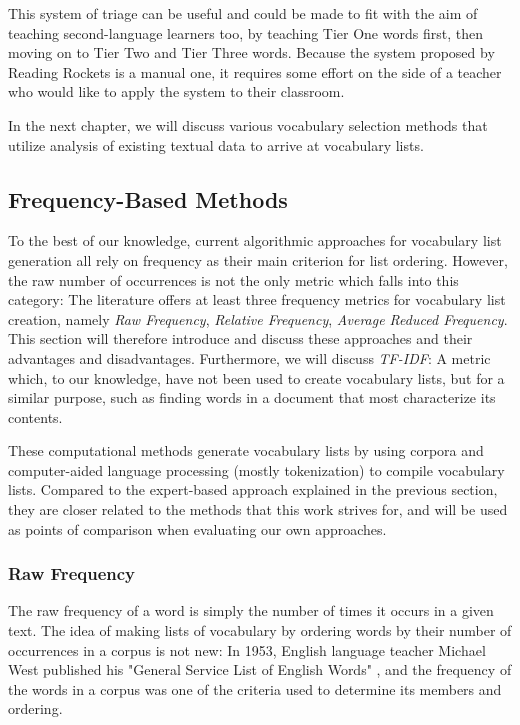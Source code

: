 This system of triage can be useful and could be made to fit with the aim of teaching second-language learners too, by teaching Tier One words first, then moving on to Tier Two and Tier Three words.
Because the system proposed by Reading Rockets is a manual one, it requires some effort on the side of a teacher who would like to apply the system to their classroom.

In the next chapter, we will discuss various vocabulary selection methods that utilize analysis of existing textual data to arrive at vocabulary lists.

\subsection{Frequency-Based Methods}
To the best of our knowledge, current algorithmic approaches for vocabulary list generation all rely on frequency as their main criterion for list ordering.
However, the raw number of occurrences is not the only metric which falls into this category:
The literature offers at least three frequency metrics for vocabulary list creation, namely \textit{Raw Frequency}, \textit{Relative Frequency}, \textit{Average Reduced Frequency}.
This section will therefore introduce and discuss these approaches and their advantages and disadvantages.
Furthermore, we will discuss \textit{TF-IDF}:
A metric which, to our knowledge, have not been used to create vocabulary lists, but for a similar purpose, such as finding words in a document that most characterize its contents.

These computational methods generate vocabulary lists by using corpora and computer-aided language processing (mostly tokenization) to compile vocabulary lists.
Compared to the expert-based approach explained in the previous section, they are closer related to the methods that this work strives for, and will be used as points of comparison when evaluating our own approaches.

\subsubsection {Raw Frequency}
The raw frequency of a word is simply the number of times it occurs in a given text.
The idea of making lists of vocabulary by ordering words by their number of occurrences in a corpus is not new:
In 1953, English language teacher Michael West published his "General Service List of English Words" \cite{michaelwestGeneralServiceList1953}, and the frequency of the words in a corpus was one of the criteria used to determine its members and ordering.

